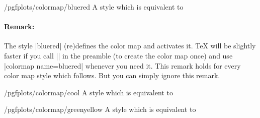 \begin{stylekey}{/pgfplots/colormap/bluered}
    A style which is equivalent to
\begin{codeexample}
\end{codeexample}


\begin{codeexample}[]
\end{codeexample}

    \paragraph{Remark:}

    The style |bluered| (re)defines the color map and activates it. \TeX{}
    will be slightly faster if you call |\pgfplotsset{colormap/bluered}| in the
    preamble (to create the color map once) and use |colormap name=bluered|
    whenever you need it. This remark holds for every color map style which
    follows. But you can simply ignore this remark.
\end{stylekey}

\begin{stylekey}{/pgfplots/colormap/cool}
    A style which is equivalent to
\begin{codeexample}
\end{codeexample}

\end{stylekey}

\begin{stylekey}{/pgfplots/colormap/greenyellow}
    A style which is equivalent to
\begin{codeexample}
\end{codeexample}

\end{stylekey}


